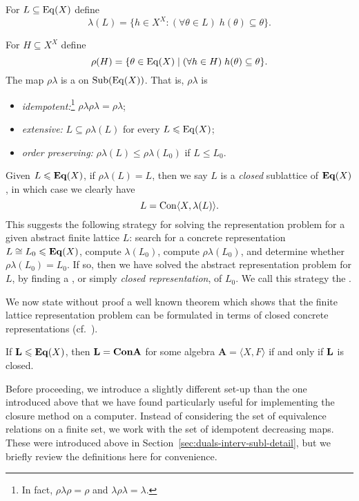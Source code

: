 For $L\subseteq \operatorname{Eq}(X)$ define
\[
\lambda(L) = \{h\in X^X: (\forall \theta \in L) \; h(\theta) \subseteq \theta \}.
\]

For $H\subseteq X^X$ define
\[
\rho(H) = \{\theta \in \operatorname{Eq}(X) \mid   (\forall h\in H) \; h(\theta) \subseteq \theta\}.
\]
The map $\rho \lambda$ is a  on $\operatorname{Sub}(\operatorname{Eq}(X))$.
That is, $\rho \lambda$ is
\begin{itemize}
\item \emph{idempotent:}\footnote{In fact, $\rho \lambda \rho = \rho$ and 
  $\lambda \rho \lambda = \lambda$.} $\rho \lambda \rho \lambda = \rho \lambda$;
\item \emph{extensive:} $L \subseteq \rho \lambda (L)$ for every $L \leqslant \operatorname{Eq}(X)$;
\item \emph{order preserving:} $\rho \lambda (L) \leq \rho \lambda (L_0)$ if $L \leq L_0$.
\end{itemize}
Given $L\leqslant \mathbf{Eq}(X)$, if $\rho\lambda(L) = L$, then we say $L$ is a 
\emph{closed} sublattice of $\mathbf{Eq}(X)$, in which case we clearly have
\[L = \operatorname{Con} \langle X, \lambda(L)\rangle.\]
This suggests the following strategy for solving the representation problem for a
given abstract finite lattice $L$: search for a concrete representation $L \cong
L_0\leqslant \mathbf{Eq}(X)$,
compute $\lambda(L_0)$, compute $\rho\lambda(L_0)$, and determine whether 
$\rho\lambda(L_0) = L_0$.  If so, then we have solved the abstract representation
problem for $L$, by finding a , or simply
\emph{closed representation}, of $L_0$.  We call this strategy the .

We now state without proof a well known theorem which shows that the finite lattice
representation problem can be formulated in terms of closed concrete
representations (cf.~\cite{Jonsson:1972}).
\begin{theorem}\label{Concrete-thm-3}
  If $\mathbf{L} \leqslant \mathbf{Eq}(X)$, then $\mathbf{L}= \mathbf{Con}\mathbf{A}$ for some algebra 
  $\mathbf{A} = \langle X, F\rangle$ if and only if $\mathbf{L}$ is closed.
\end{theorem}

Before proceeding, we introduce a slightly different set-up than the
one introduced above that we have found particularly useful
for implementing the closure method on a computer. Instead of considering the
set of equivalence relations on a finite set, we work with the set of idempotent
decreasing maps.  These were introduced above in
Section~\ref{sec:duals-interv-subl-detail}, but we briefly review the definitions here
for convenience.

